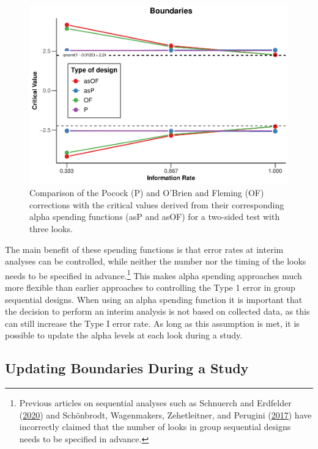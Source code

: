 \documentclass[
  english,
  ,jou, a4paper,floatsintext]{apa6}
\begin{document}
\begin{figure}
\centering
\includegraphics{sequential_tutorial_files/figure-latex/spending-comparison-2-1.pdf}
\caption{\label{fig:spending-comparison-2}Comparison of the Pocock (P) and O'Brien and Fleming (OF) corrections with the critical values derived from their corresponding alpha spending functions (asP and asOF) for a two-sided test with three looks.}
\end{figure}

The main benefit of these spending functions is that error rates at interim analyses can be controlled, while neither the number nor the timing of the looks needs to be specified in advance.\footnote{Previous articles on sequential analyses such as Schnuerch and Erdfelder (\protect\hyperlink{ref-schnuerch_controlling_2020}{2020}) and Schönbrodt, Wagenmakers, Zehetleitner, and Perugini (\protect\hyperlink{ref-schonbrodt_sequential_2017}{2017}) have incorrectly claimed that the number of looks in group sequential designs needs to be specified in advance.} This makes alpha spending approaches much more flexible than earlier approaches to controlling the Type 1 error in group sequential designs. When using an alpha spending function it is important that the decision to perform an interim analysis is not based on collected data, as this can still increase the Type I error rate. As long as this assumption is met, it is possible to update the alpha levels at each look during a study.

\hypertarget{updating-boundaries-during-a-study}{%
\subsection{Updating Boundaries During a Study}\label{updating-boundaries-during-a-study}}
\end{document}
